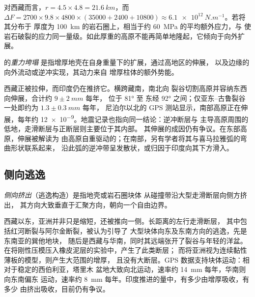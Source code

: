 对西藏而言，$r = 4.5 \times 4.8 = \qty{21.6}{km}$，而 $\Delta F = 2700 \times 9.8 \times 4800
\times (35000 + 2400 + 10800) \approx \qty{6.1e12}{N.m^{-1}}$。若将其分布于
厚度为 \qty{100}{km} 的岩石圈上，相当于约 \qty{60}{MPa} 的平均额外应力，与
使岩石破裂的应力同一量级。如此厚重的高原不能再简单地隆起，它倾向于向外扩展。

\begin{definition}[重力垮塌]\label{def:b2:himalaya-andes:collapse}
的\emph{重力垮塌}
是指增厚地壳在自身重量下的扩展，通过高地区的伸展，
以及边缘的向外流动或逆冲实现，其动力来自
增厚柱体的额外势能。
\end{definition}

西藏正被拉伸，而印度仍在推挤它。横跨藏南，南北向
裂谷切割高原并容纳东西向伸展，合计约 $9 \pm \qty{2}{mm}$ 每年，
位于 \ang{81} 至 东经 \ang{92} 之间；仅亚东–古鲁裂谷一处即约为 $1.3 \pm \qty{0.3}{mm}$ 每年，
尼泊尔以北的 GPS 测站显示，南部高原正在伸展，每年约
\num{12e-9}。地震记录也指向同一结论：逆冲断层与
主导高原周围的低地，走滑断层与正断层则主要位于其内部。
其伸展的成因仍有争议。在东部高原，伸展被解读为
由高原自重驱动的；在南部，另有学者将其与喜马拉雅弧的弯曲形状联系起来，
沿此弧的逆冲带呈发散状，或归因于印度向其下方滑入。

\subsection{侧向逃逸}

\begin{definition}[侧向挤出]\label{def:b2:himalaya-andes:extrusion}
\emph{侧向挤出}（逃逸构造）是指地壳或岩石圈块体
从碰撞带沿大型走滑断层向侧方挤出，
其方向大致垂直于汇聚方向，朝向一个自由边界。
\end{definition}

西藏以东，亚洲并非只是缩短，还被推向一侧。长距离的左行走滑断层，
其中包括红河断裂与阿尔金断裂，被认为引导了
大型块体向东及东南方向的逃逸，先是东南亚的巽他地块，
随后是西藏与华南，同时其远端张开了裂谷与年轻的洋盆。
在将刚性压模压入橡皮泥层的实验中，产生了此类断层；
而将亚洲视为连续黏性薄板的模型，则产生大范围的增厚，
且没有大断层。GPS 数据支持块体运动：相对于稳定的西伯利亚，塔里木
盆地大致向北运动，速率约 \qty{14}{mm} 每年，华南则向东南偏东
运动，速率约 \qty{8}{mm} 每年。印度推进的量中，有多少由增厚吸收，有多少
由挤出吸收，目前仍有争议。

